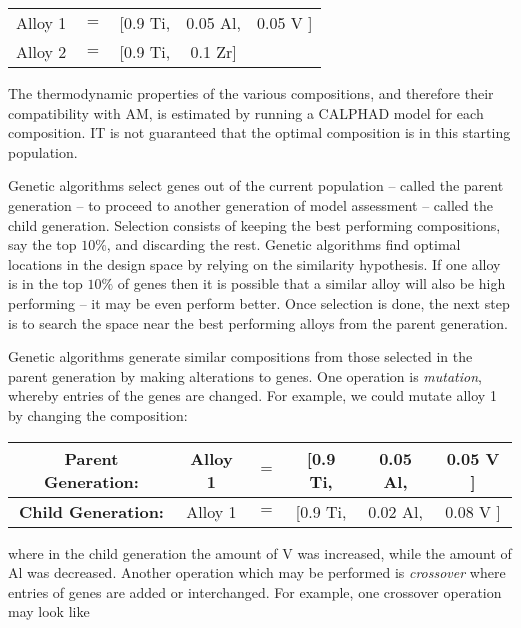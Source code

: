 \begin{table}[h!]
\begin{center}
\begin{tabular}{ccccc}
	Alloy 1 & $=$ & [0.9 Ti, & 0.05 Al, & 0.05 V ] \\
	Alloy 2 & $=$ & [0.9 Ti, & 0.1 Zr] & \\
\end{tabular}
\end{center}
\end{table}
The thermodynamic properties of the various compositions, and therefore their compatibility with AM, is estimated by running a CALPHAD model for each composition. IT is not guaranteed that the optimal composition is in this starting population.

Genetic algorithms select genes out of the current population -- called the parent generation --  to proceed to another generation of model assessment -- called the child generation. Selection consists of keeping the best performing compositions, say the top $10\%$, and discarding the rest. Genetic algorithms find optimal locations in the design space by relying on the similarity hypothesis. If one alloy is in the top $10\%$ of genes then it is possible that a similar alloy will also be high performing -- it may be even perform better. Once selection is done, the next step is to search the space near the best performing alloys from the parent generation.

Genetic algorithms generate similar compositions from those selected in the parent generation by making alterations to genes. One operation is \textit{mutation}, whereby entries of the genes are changed. For example, we could mutate alloy 1 by changing the composition:

\begin{table}[h!]
\begin{center}
\begin{tabular}{c|ccccc}
	\textbf{Parent Generation:} & Alloy 1 & $=$ & [0.9 Ti, & {\color{red}0.05} Al, & {\color{red}0.05} V ] \\ \hline
	\textbf{Child Generation:} & Alloy 1 & $=$ & [0.9 Ti, & {\color{green}0.02} Al, & {\color{green}0.08} V  ]  \\ 
\end{tabular}
\end{center}
\end{table}
where in the child generation the amount of V was increased, while the amount of Al was decreased. Another operation which may be performed is \textit{crossover} where entries of genes are added or interchanged. For example, one crossover operation may look like

